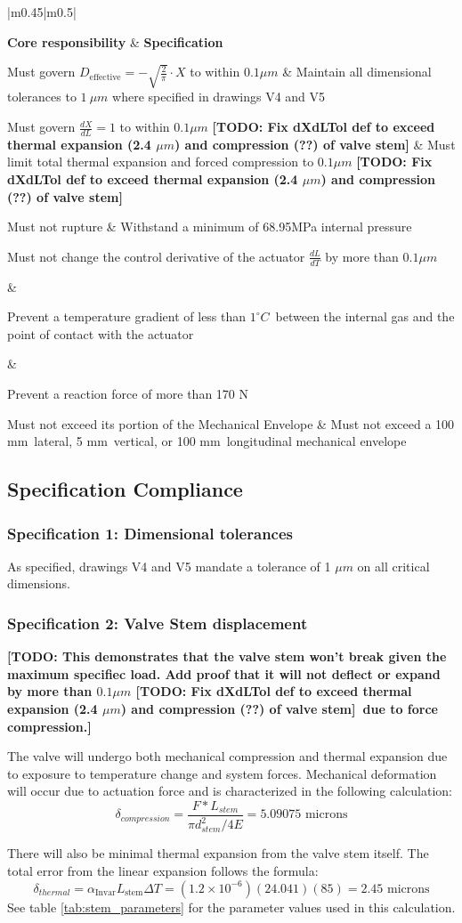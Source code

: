 \documentclass[12pt, letterpaper]{report}%
\newcounter{mycounter}           %
\newcounter{sub}[mycounter]      %
\newcommand{\degC}{^{\circ}C}    %
\newcommand{\specPressure}{68.95}%
\newcommand{\dDdXTol}{$0.1 \mu m$}
\newcommand{\dXdLTol}{$0.1 \mu m$ \todo{Fix dXdLTol def to exceed thermal expansion (2.4 $\mu m$) and compression (??) of valve stem}}
\newcommand{\dLdTTolValve}{$0.1 \mu m$}
\newcommand{\dTTol}{$1 \degC$}
\newcommand{\FTolValve}{170 N}
\newcommand{\valveMEX}{100 mm}
\newcommand{\valveMEY}{5 mm}
\newcommand{\valveMEZ}{100 mm}
\newcommand{\todo}[1]{{\bfseries\color{red}[TODO: #1]}}
\newcommand{\valveSpecs}
{%
    \begin{tabular}{|m{0.45\textwidth}|m{0.5\textwidth}|}

        \hline

            \textbf{Core responsibility}
                & 
            \textbf{Specification} \\ 
            
        \hline

        \vspace{0pt}
            Must govern
            $D_{\text{effective}} = -\sqrt{\frac{2}{\pi}} \cdot X$
            to within \dDdXTol
                &
            Maintain all dimensional tolerances to $1\ \mu m$ where specified in drawings V4 and V5 \\
            
        \hline

        \vspace{0pt}
            Must govern
            $\frac{dX}{dL} = 1$
            to within \dXdLTol
                &
            Must limit total thermal expansion and forced compression to \dXdLTol \\
            
        \hline

            Must not rupture
                &
            Withstand a minimum of \specPressure MPa internal pressure \\
            
        \hline

            \multirow[c]{2}{0.45\textwidth}
                {%
                    Must not change the control derivative
                    of the actuator $\frac{dL}{dT}$
                    by more than \dLdTTolValve%
                }

                    &

            \rule{0pt}{1.5em}
                Prevent a temperature gradient of less than \dTTol\ between the internal gas and the point of contact with the actuator \\
            \cline{2-2}
        
                    &
        
            \rule{0pt}{2.5em}Prevent a reaction force of more than \FTolValve \\
            
        \hline

            Must not exceed its portion of the Mechanical Envelope
                &
            Must not exceed a \valveMEX\ lateral, \valveMEY\ vertical, or \valveMEZ\ longitudinal mechanical envelope \\

        \hline

    \end{tabular}
}
\begin{document}
        \begin{table}[H]
            \centering
            \caption{Valve Specifications (repeated)}
            \valveSpecs
            \label{tab:valve_specs_disc}
            \renewcommand{\arraystretch}{1.4}
        \end{table}
        \subsection{Specification Compliance}
        \subsubsection{Specification 1: Dimensional tolerances}
        \label{subsec:valve_spec_1}

            As specified, drawings V4 and V5 mandate a tolerance of 1 $\mu m$ on all critical dimensions.

        \subsubsection{Specification 2: Valve Stem displacement}
        \label{subsec:valve_spec_2}

                \todo{This demonstrates that the valve stem won't break given the maximum specifiec load.
                    Add proof that it will not deflect or expand by more than \dXdLTol\ due to force compression.}

                    The valve will undergo both mechanical compression and thermal expansion due to exposure to temperature change and system forces.
                    Mechanical deformation will occur due to actuation force and is characterized in the following calculation:
                \begin{equation}
                    \delta_{compression} = \frac{F *L_{stem}}{\pi d_{stem}^2/4 E} = 5.09075 \text{ microns}
                    \label{eq:stem_compression}
                \end{equation}


                There will also be minimal thermal expansion from the valve stem itself. The total error from the linear expansion follows the formula:
                \begin{equation}
                    \delta_{thermal} = \alpha_{\text{Invar}} L_{\text{stem}} \Delta T = (1.2 \times 10^{-6})(24.041)(85) = 2.45 \text{ microns}
                    \label{eq:stem_thermal_expansion}
                \end{equation}
                See table \ref{tab:stem_parameters} for the parameter values used in this calculation.
\end{document}
